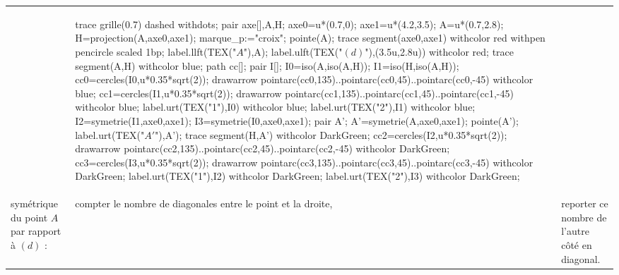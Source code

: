 \begin{methode*1}
\begin{tabular}{>{\centering\arraybackslash}p{50mm}>{\centering\arraybackslash}p{50mm}>{\centering\arraybackslash}p{50mm}}
            &
         \begin{Geometrie}[CoinHD={(4.21u,3.51u)}]                        
            trace grille(0.7) dashed withdots;
            pair axe[],A,H;
            axe0=u*(0.7,0);
            axe1=u*(4.2,3.5);
            A=u*(0.7,2.8);
            H=projection(A,axe0,axe1);
            marque_p:="croix";
            pointe(A);
            trace segment(axe0,axe1) withcolor red withpen pencircle scaled 1bp;
            label.llft(TEX("$A$"),A);
            label.ulft(TEX("$(d)$"),(3.5u,2.8u)) withcolor red;
            trace segment(A,H) withcolor blue;
            path cc[];
            pair I[];
            I0=iso(A,iso(A,H));
            I1=iso(H,iso(A,H));
            cc0=cercles(I0,u*0.35*sqrt(2));            
            drawarrow pointarc(cc0,135)..pointarc(cc0,45)..pointarc(cc0,-45) withcolor blue;
            cc1=cercles(I1,u*0.35*sqrt(2));            
            drawarrow pointarc(cc1,135)..pointarc(cc1,45)..pointarc(cc1,-45) withcolor blue;
            label.urt(TEX("\num{1}"),I0) withcolor blue;
            label.urt(TEX("\num{2}"),I1) withcolor blue;
            I2=symetrie(I1,axe0,axe1);
            I3=symetrie(I0,axe0,axe1);
            pair A';
            A'=symetrie(A,axe0,axe1);
            pointe(A');
            label.urt(TEX("$A'$"),A');
            trace segment(H,A') withcolor DarkGreen;
            cc2=cercles(I2,u*0.35*sqrt(2));            
            drawarrow pointarc(cc2,135)..pointarc(cc2,45)..pointarc(cc2,-45) withcolor DarkGreen;
            cc3=cercles(I3,u*0.35*sqrt(2));            
            drawarrow pointarc(cc3,135)..pointarc(cc3,45)..pointarc(cc3,-45) withcolor DarkGreen;
            label.urt(TEX("\num{1}"),I2) withcolor DarkGreen;
            label.urt(TEX("\num{2}"),I3) withcolor DarkGreen;
         \end{Geometrie}
         \\
            symétrique du point $A$ par rapport à $(d)$ :
            &
            compter le nombre de diagonales entre le point et la droite,
            &
            reporter ce nombre de l'autre côté en diagonal. \\
         \end{tabular}
         \vspace*{-5mm}
   \end{methode*1}